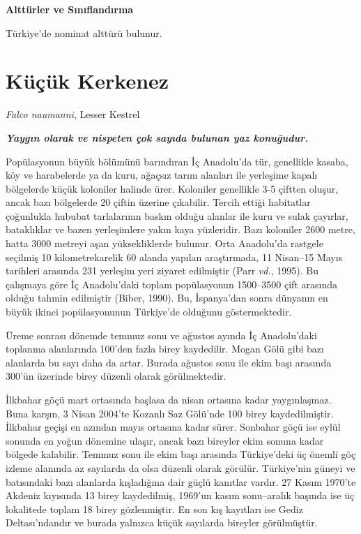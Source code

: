 \documentclass[
  10.5pt,
  a4paper,
  DIV=11,
  numbers=noendperiod,
  twocolumn]{scrreprt}
\begin{document}
\textbf{Alttürler ve Sınıflandırma}

Türkiye'de nominat alttürü bulunur.

\section{Küçük Kerkenez}\label{kuxfcuxe7uxfck-kerkenez}

\emph{Falco naumanni}, Lesser Kestrel

\textbf{\emph{Yaygın olarak ve nispeten çok sayıda bulunan yaz
konuğudur.}}

Popülasyonun büyük bölümünü barındıran İç Anadolu'da tür, genellikle
kasaba, köy ve harabelerde ya da kuru, ağaçsız tarım alanları ile
yerleşime kapalı bölgelerde küçük koloniler halinde ürer. Koloniler
genellikle 3-5 çiftten oluşur, ancak bazı bölgelerde 20 çiftin üzerine
çıkabilir. Tercih ettiği habitatlar çoğunlukla hububat tarlalarının
baskın olduğu alanlar ile kuru ve sulak çayırlar, bataklıklar ve bazen
yerleşimlere yakın kaya yüzleridir. Bazı koloniler 2600 metre, hatta
3000 metreyi aşan yüksekliklerde bulunur. Orta Anadolu'da rastgele
seçilmiş 10 kilometrekarelik 60 alanda yapılan araştırmada, 11 Nisan--15
Mayıs tarihleri arasında 231 yerleşim yeri ziyaret edilmiştir (Parr
\emph{vd.}, 1995). Bu çalışmaya göre İç Anadolu'daki toplam popülasyonun
1500--3500 çift arasında olduğu tahmin edilmiştir (Biber, 1990). Bu,
İspanya'dan sonra dünyanın en büyük ikinci popülasyonunun Türkiye'de
olduğunu göstermektedir.

Üreme sonrası dönemde temmuz sonu ve ağustos ayında İç Anadolu'daki
toplanma alanlarında 100'den fazla birey kaydedilir. Mogan Gölü gibi
bazı alanlarda bu sayı daha da artar. Burada ağustos sonu ile ekim başı
arasında 300'ün üzerinde birey düzenli olarak görülmektedir.

İlkbahar göçü mart ortasında başlasa da nisan ortasına kadar
yaygınlaşmaz. Buna karşın, 3 Nisan 2004'te Kozanlı Saz Gölü'nde 100
birey kaydedilmiştir. İlkbahar geçişi en azından mayıs ortasına kadar
sürer. Sonbahar göçü ise eylül sonunda en yoğun dönemine ulaşır, ancak
bazı bireyler ekim sonuna kadar bölgede kalabilir. Temmuz sonu ile ekim
başı arasında Türkiye'deki üç önemli göç izleme alanında az sayılarda da
olsa düzenli olarak görülür. Türkiye'nin güneyi ve batısındaki bazı
alanlarda kışladığına dair güçlü kanıtlar vardır. 27 Kasım 1970'te
Akdeniz kıyısında 13 birey kaydedilmiş, 1969'un kasım sonu--aralık
başında ise üç lokalitede toplam 18 birey gözlenmiştir. En son kış
kayıtları ise Gediz Deltası'ndandır ve burada yalnızca küçük sayılarda
bireyler görülmüştür.
\end{document}
